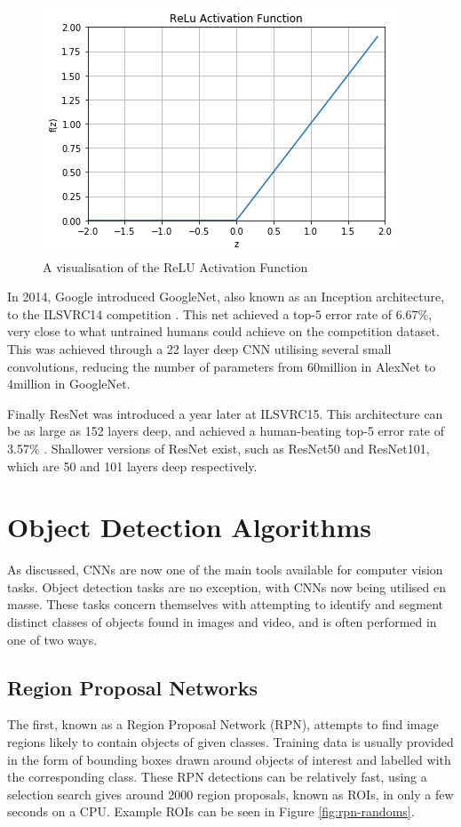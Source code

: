 \begin{figure}
	\begin{center}
		\includegraphics[scale=0.6]{Chapter2/figs/relu.png}
	\end{center}
	\caption{A visualisation of the ReLU Activation Function}
	\label{fig:relu}
\end{figure}

 In 2014, Google introduced GoogleNet, also known as an Inception architecture, to the ILSVRC14 competition \cite{szegedy_going_2015}. This net achieved a top-5 error rate of 6.67\%, very close to what untrained humans could achieve on the competition dataset. This was achieved through a 22 layer deep CNN utilising several small convolutions, reducing the number of parameters from 60million in AlexNet to 4million in GoogleNet. 

Finally ResNet was introduced a year later at ILSVRC15. This architecture can be as large as 152 layers deep, and achieved a human-beating top-5 error rate of 3.57\% \cite{he_deep_2015}. Shallower versions of ResNet exist, such as ResNet50 and ResNet101, which are 50 and 101 layers deep respectively. 

\section{Object Detection Algorithms}\label{ch:Background,sec:objectDetection}
As discussed, CNNs are now one of the main tools available for computer vision tasks. Object detection tasks are no exception, with CNNs now being utilised en masse. These tasks concern themselves with attempting to identify and segment distinct classes of objects found in images and video, and is often performed in one of two ways. 

\subsection{Region Proposal Networks}\label{ch:Background,sec:objectDetection,sub:RPN}
The first, known as a Region Proposal Network (RPN), attempts to find image regions likely to contain objects of given classes. Training data is usually provided in the form of bounding boxes drawn around objects of interest and labelled with the corresponding class. These RPN detections can be relatively fast, using a selection search \cite{uijlings_selective_2013} gives around 2000 region proposals, known as ROIs, in only a few seconds on a CPU. Example ROIs can be seen in Figure \ref{fig:rpn-randoms}.

